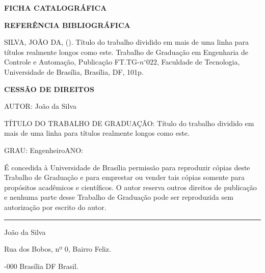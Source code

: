 \noindent \textbf{FICHA CATALOGRÁFICA}

\noindent %

\noindent \medskip{}


\noindent \textbf{REFERÊNCIA BIBLIOGRÁFICA}

SILVA, JOÃO DA, (\the\year). Título do trabalho dividido em mais de uma
linha para títulos realmente longos como este. Trabalho de Graduação
em Engenharia de Controle e Automação, Publicação FT.TG-$n^{\circ}022$,
Faculdade de Tecnologia, Universidade de Brasília, Brasília, DF, 101p.

\noindent \bigskip{}


\noindent \textbf{CESSÃO DE DIREITOS}

\noindent AUTOR: João da Silva

TÍTULO DO TRABALHO DE GRADUAÇÃO: Título do trabalho dividido em mais
de uma linha para títulos realmente longos como este.

\noindent \medskip{}


\noindent GRAU: Engenheiro\hfill{}ANO: \the\year\hfill{}

\noindent \medskip{}


É concedida à Universidade de Brasília permissão para reproduzir cópias
deste Trabalho de Graduação e para emprestar ou vender tais cópias
somente para propósitos acadêmicos e científicos. O autor reserva
outros direitos de publicação e nenhuma parte desse Trabalho de Graduação
pode ser reproduzida sem autorização por escrito do autor.

\noindent \bigskip{}


\noindent \rule[0.5ex]{1\columnwidth}{1pt}

\noindent João da Silva

\noindent Rua dos Bobos, nº 0, Bairro Feliz.

-000 Brasília \textendash{} DF \textendash{} Brasil.
